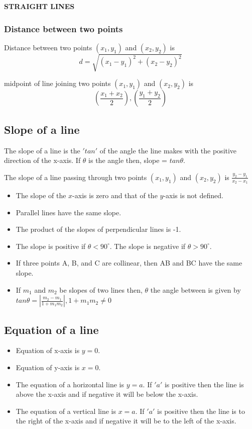 \documentclass[12pt]{article}
\begin{document}
\begin{center}
    {\LARGE \textbf{STRAIGHT LINES} }
\end{center}

\begin{multicols}{2}

\subsubsection*{Distance between two points}
    Distance between two points $(x_1,y_1)$ and $(x_2,y_2)$ is 
    $$d=\sqrt{(x_1-y_1)^2+(x_2-y_2)^2}$$

    midpoint of line joining two points $(x_1,y_1)$ and $(x_2,y_2)$ is 
    $$(\frac{x_1+x_2}{2}),(\frac{y_1+y_2}{2})$$
\subsection*{Slope of a line }
The slope of a line is the $'tan'$ of the angle the line makes with the positive direction of the x-axis. If $\theta$ is the angle then, slope = $tan \theta$.

The slope of a line passing through two points $(x_1, y_1)$ and $(x_2, y_2)$ is $\frac{y_2 -y_1}{x_2 -x_1}$
\begin{itemize}
    \item The slope of the $x$-axis is zero and that of the $y$-axis is not defined.
    \item Parallel lines have the same slope.
    \item The product of the slopes of perpendicular lines is -1.
    \item The slope is positive if $\theta < 90^{\circ}$. The slope is negative if $\theta > 90^{\circ}$.
    \item If three points A, B, and C are collinear, then AB and BC have the same slope.
    \item If $m_1$ and $m_2$ be slopes of two lines then, $\theta$ the angle between is given by $tan \theta =|\frac{m_2-m_1}{1+m_1m_2}|, 1+m_1m_2 \not =0$
\end{itemize}
\subsection*{Equation of a line}
\begin{itemize}
    \item Equation of x-axis is $y = 0$.
    \item Equation of y-axis is $x = 0$.
    \item The equation of a horizontal line is $y = a$. If $'a'$ is positive then the line is above the x-axis and if negative it will be below the x-axis.
    \item The equation of a vertical line is $x = a$. If $'a'$ is positive then the line is to the right of the x-axis and if negative it will be to the left of the x-axis.
\end{itemize}

\end{multicols}
\end{document}
